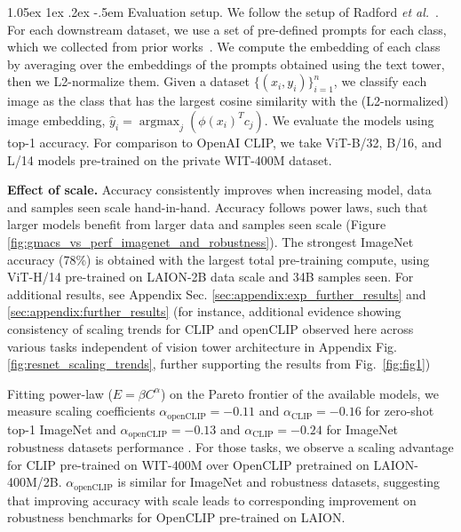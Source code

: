\documentclass[11pt,table]{article}
\makeatletter
\DeclareMathOperator*{\argmax}{argmax} %
\newcommand{\citep}{\cite}
\renewcommand\paragraph{\@startsection{paragraph}{4}{\z@}                                     {1.05ex \@plus1ex \@minus.2ex}                                {-.5em}
{\normalfont\normalsize\bfseries}}
\makeatother
\begin{document}
\paragraph{Evaluation setup.}
We follow the setup of Radford \textit{et al.}~\cite{radford2021learning}. For each downstream dataset, we use a set of pre-defined prompts for each class, which we collected from prior works~\cite{radford2021learning,zhai2021lit}.
We compute the embedding of each class by averaging over the embeddings of the prompts obtained using the text tower, then we L2-normalize them. 
Given a dataset $\{(x_i,y_i)\}_{i=1}^n$, we classify each image as the class that has the largest cosine similarity with the (L2-normalized) image embedding, $\hat{y}_i = \argmax_j (\phi(x_i)^Tc_j)$. We evaluate the models using top-1 accuracy. For comparison to OpenAI CLIP, we take ViT-B/32, B/16, and L/14 models pre-trained on the private WIT-400M dataset.

\textbf{Effect of scale.} Accuracy consistently improves when increasing model, data and samples seen scale hand-in-hand. Accuracy follows power laws, such that larger models benefit from larger data and samples seen scale (Figure \ref{fig:gmacs_vs_perf_imagenet_and_robustness}). The strongest ImageNet accuracy (78\%) is obtained with the largest total pre-training compute, using ViT-H/14 pre-trained on LAION-2B data scale and 34B samples seen. For additional results, see Appendix Sec. \ref{sec:appendix:exp_further_results} and \ref{sec:appendix:further_results} (for instance, additional evidence showing consistency of scaling trends for CLIP and openCLIP observed here across various tasks independent of vision tower architecture in Appendix Fig. \ref{fig:resnet_scaling_trends}, further supporting the results from Fig.~\ref{fig:fig1})



Fitting power-law ($E = \beta C^{\alpha}$) on the Pareto frontier of the available models, we measure scaling coefficients $\alpha_{\text{openCLIP}}=-0.11$ and $\alpha_{\text{CLIP}}=-0.16$ for zero-shot top-1 ImageNet and $\alpha_{\text{openCLIP}}=-0.13$ and $\alpha_{\text{CLIP}}=-0.24$ for ImageNet robustness datasets performance \citep{imagenetr,imagenetc,imageneta,imagenetsketch}. For those tasks, we observe a scaling advantage for CLIP pre-trained on WIT-400M over OpenCLIP pretrained on LAION-400M/2B. $\alpha_{\text{openCLIP}}$ is similar for ImageNet and robustness datasets, suggesting that improving accuracy with scale leads to corresponding improvement on robustness benchmarks for OpenCLIP pre-trained on LAION.
\end{document}
